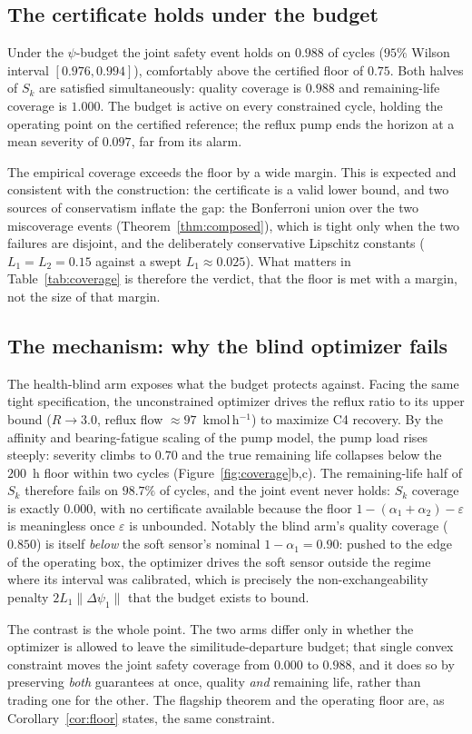 \subsection{The certificate holds under the budget}
\label{sec:res-cert}

Under the $\psi$-budget the joint safety event holds on $0.988$ of cycles
($95\%$ Wilson interval $[0.976, 0.994]$), comfortably above the certified floor of
$0.75$. Both halves of $S_k$ are satisfied simultaneously: quality coverage is
$0.988$ and remaining-life coverage is $1.000$. The budget is active on every
constrained cycle, holding the operating point on the certified reference; the
reflux pump ends the horizon at a mean severity of $0.097$, far from its alarm.

The empirical coverage exceeds the floor by a wide margin. This is expected and
consistent with the construction: the certificate is a valid lower bound, and two
sources of conservatism inflate the gap: the Bonferroni union over the two
miscoverage events (Theorem~\ref{thm:composed}), which is tight only when the two
failures are disjoint, and the deliberately conservative Lipschitz constants
($L_1=L_2=0.15$ against a swept $L_1\approx0.025$). What matters in
Table~\ref{tab:coverage} is therefore the verdict, that the floor is met with a
margin, not the size of that margin.

\subsection{The mechanism: why the blind optimizer fails}
\label{sec:res-mech}

The health-blind arm exposes what the budget protects against. Facing the same
tight specification, the unconstrained optimizer drives the reflux ratio to its
upper bound ($R\to3.0$, reflux flow $\approx\!97$~kmol\,h$^{-1}$) to maximize C4
recovery. By the affinity and bearing-fatigue scaling of the pump model, the
pump load rises steeply: severity climbs to $0.70$ and the true remaining life
collapses below the $200$~h floor within two cycles
(Figure~\ref{fig:coverage}b,c). The remaining-life half of $S_k$ therefore fails on
$98.7\%$ of cycles, and the joint event never holds: $S_k$ coverage is exactly
$0.000$, with no certificate available because the floor $1-(\alpha_1+\alpha_2)-
\varepsilon$ is meaningless once $\varepsilon$ is unbounded. Notably the blind arm's
quality coverage ($0.850$) is itself \emph{below} the soft sensor's nominal
$1-\alpha_1=0.90$: pushed to the edge of the operating box, the optimizer drives the
soft sensor outside the regime where its interval was calibrated, which is precisely the
non-exchangeability penalty $2L_1\|\Delta\psi_1\|$ that the budget exists to bound.

The contrast is the whole point. The two arms differ only in whether the optimizer
is allowed to leave the similitude-departure budget; that single convex constraint
moves the joint safety coverage from $0.000$ to $0.988$, and it does so by
preserving \emph{both} guarantees at once, quality \emph{and} remaining life,
rather than trading one for the other. The flagship theorem and the operating floor
are, as Corollary~\ref{cor:floor} states, the same constraint.
